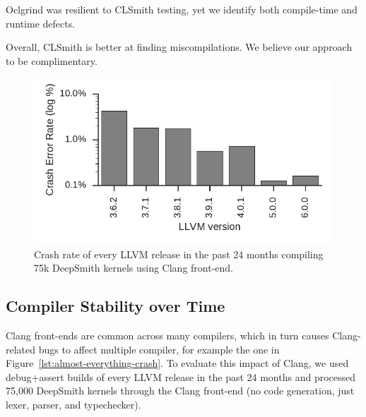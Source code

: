 Oclgrind was resilient to CLSmith testing, yet we identify both compile-time and runtime defects.

Overall, CLSmith is better at finding miscompilations. We believe our approach to be complimentary.


\begin{figure}
  \centering %
  \includegraphics[width=.95\columnwidth]{build/img/clang-crashes}%
  \caption{%
    Crash rate of every LLVM release in the past 24 months compiling 75k DeepSmith kernels using Clang front-end.%
  }%
  \label{fig:clangs} %
\end{figure}

\begin{table}
  \scriptsize %
  \centering %
  
  \caption{%
    Distinct Clang front-end assertions triggered by DeepSmith, and the number of distinct unreachables.%
  }
  \label{tab:clangs}
\end{table}


\subsection{Compiler Stability over Time}%

Clang front-ends are common across many compilers, which in turn causes Clang-related bugs to affect multiple compiler, for example the one in Figure~\ref{lst:almost-everything-crash}. To evaluate this impact of Clang, we used debug+assert builds of every LLVM release in the past 24 months and processed 75,000 DeepSmith kernels through the Clang front-end (no code generation, just lexer, parser, and typechecker).

